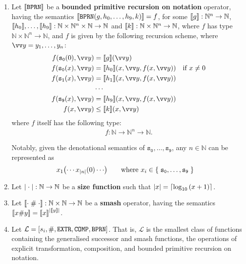 \begin{definition}
\begin{enumerate}[label=(\arabic*)]
\item Let ${\mathopen{}\left\llbracket{\mathtt{BPRN}}\right\rrbracket\mathclose{}}$ be a \textbf{bounded primitive recursion on
notation} operator, having the semantics
${\mathopen{}\left\llbracket{\mathtt{BPRN}{\ensuremath{\mathopen{}\left({g,h_0,\ldots,h_9,k}\right)\mathclose{}}}}\right\rrbracket\mathclose{}} = f$, for some ${\mathopen{}\left\llbracket{g}\right\rrbracket\mathclose{}} :
\mathbb{N}^n \rightarrow \mathbb{N}$, ${\mathopen{}\left\llbracket{h_0}\right\rrbracket\mathclose{}}, \ldots, {\mathopen{}\left\llbracket{h_9}\right\rrbracket\mathclose{}} :
\mathbb{N} \times \mathbb{N}^n \times \mathbb{N} \rightarrow \mathbb{N}$ and
${\mathopen{}\left\llbracket{k}\right\rrbracket\mathclose{}} : \mathbb{N} \times \mathbb{N}^n \rightarrow \mathbb{N}$, where $f$
has type $\mathbb{N} \times \mathbb{N}^n \rightarrow \mathbb{N}$, and $f$ is
given by the following recursion scheme, where $\vect{y} =
y_1,\ldots,y_n$:\begin{align*}
%
f\p{\mathtt{s_0}\p{0}, \vect{y}} &= \sem{g}\p{\vect{y}} \\
%
f\p{\mathtt{s_0}\p{x}, \vect{y}} &= \sem{h_0}\p{x, \vect{y}, f\p{x, \vect{y}}}
& \text{if $x\neq 0$}\\
%
f\p{\mathtt{s_1}\p{x}, \vect{y}} &= \sem{h_1}\p{x, \vect{y}, f\p{x, \vect{y}}}
\\
%
&\cdots \\
%
f\p{\mathtt{s_9}\p{x}, \vect{y}} &= \sem{h_9}\p{x, \vect{y}, f\p{x, \vect{y}}}
\\
%
f\p{x, \vect{y}} &\leq \sem{k}\p{x, \vect{y}}
%
\end{align*} where $f$ itself has the following type:\begin{align*}
%
f : \mathbb{N} \rightarrow \mathbb{N}^n \rightarrow \mathbb{N}.
%
\end{align*}

Notably, given the denotational semantics of
$\mathtt{s_0},\ldots,\mathtt{s_9}$, any $n \in \mathbb{N}$ can be represented
as \begin{align*}
%
x_1\p{\cdots x_{\card{n}}\p{0} \cdots} & \quad \quad \text{where $x_i \in
\set{\mathtt{s_0}, \ldots, \mathtt{s_9}}$}
%
\end{align*}



\item Let ${\mathopen{}\left|{\mathrel{}\cdot\mathrel{}}\right|\mathclose{}} : \mathbb{N} \rightarrow
\mathbb{N}$ be a \textbf{size function} such that ${\mathopen{}\left|{x}\right|\mathclose{}} =
\mathopen{}\left\lceil{\log_{10}{\ensuremath{\mathopen{}\left({x+1}\right)\mathclose{}}}}\right\rceil\mathclose{}$.

\item Let ${\mathopen{}\left\llbracket{\ensuremath{\cdot}\; \ensuremath{\mathtt{\#}}{} \; \ensuremath{\cdot}}\right\rrbracket\mathclose{}} : \mathbb{N} \times
\mathbb{N} \rightarrow \mathbb{N}$ be a \textbf{smash} operator, having the
semantics ${\mathopen{}\left\llbracket{x \ensuremath{\mathtt{\#}}{} y}\right\rrbracket\mathclose{}} = {\mathopen{}\left\llbracket{x}\right\rrbracket\mathclose{}}^{\mathopen{}\left|{{\mathopen{}\left\llbracket{y}\right\rrbracket\mathclose{}}}\right|\mathclose{}}$.

\item Let $\mathcal{L} = \mathopen{}\left[{s_i, \mathtt{\#}{}, \mathtt{EXTR}, \mathtt{COMP},
\mathtt{BPRN}}\right]\mathclose{}$. That is, $\mathcal{L}$ is the smallest class of functions
containing the generalised successor and smash functions, 
the operations of explicit transformation, composition, and bounded primitive
recursion on notation.

\end{enumerate}

\end{definition}


